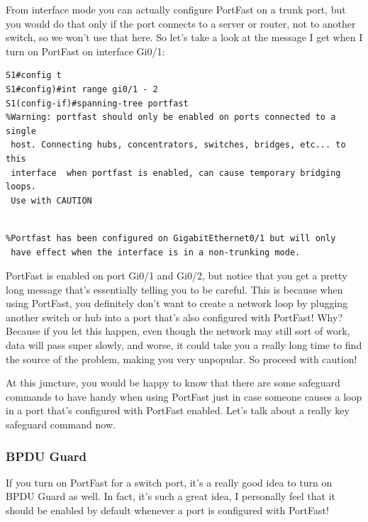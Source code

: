 From interface mode you can actually configure PortFast on a trunk port,
but you would do that only if the port connects to a server or router,
not to another switch, so we won't use that here. So let's take a look
at the message I get when I turn on PortFast on interface Gi0/1:

\begin{verbatim}
S1#config t
S1#config)#int range gi0/1 - 2
S1(config-if)#spanning-tree portfast
%Warning: portfast should only be enabled on ports connected to a single
 host. Connecting hubs, concentrators, switches, bridges, etc... to this
 interface  when portfast is enabled, can cause temporary bridging loops.
 Use with CAUTION
\end{verbatim}

\begin{verbatim}
 
%Portfast has been configured on GigabitEthernet0/1 but will only
 have effect when the interface is in a non-trunking mode.
\end{verbatim}

PortFast is enabled on port Gi0/1 and Gi0/2, but notice that you get a
pretty long message that's essentially telling you to be careful. This
is because when using PortFast, you definitely don't want to create a
network loop by plugging another switch or hub into a port that's also
configured with PortFast! Why? Because if you let this happen, even
though the network may still sort of work, data will pass super slowly,
and worse, it could take you a really long time to find the source of
the problem, making you very unpopular. So proceed with caution!

At this juncture, you would be happy to know that there are some
safeguard commands to have handy when using PortFast just in case
someone causes a loop in a port that's configured with PortFast enabled.
Let's talk about a really key safeguard command now.

\subsubsection[BPDU
Guard]{\texorpdfstring{\protect\hypertarget{c15.xhtmlux5cux23c15-sec-18}{}{}BPDU
Guard}{BPDU Guard}}

If you turn on PortFast for a switch port, it's a really good idea to
turn on BPDU Guard as well. In fact, it's such a great idea, I
personally feel that it should be enabled by default whenever a port is
configured with PortFast!

